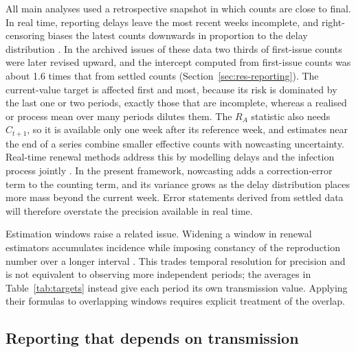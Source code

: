 All main analyses used a retrospective snapshot in which counts are close to final. In real time, reporting delays leave the most recent weeks incomplete, and right-censoring biases the latest counts downwards in proportion to the delay distribution \citep{hohle2014bayesian, mcgough2020nowcasting}. In the archived issues of these data two thirds of first-issue counts were later revised upward, and the intercept computed from first-issue counts was about 1.6 times that from settled counts (Section~\ref{sec:res-reporting}). The current-value target is affected first and most, because its risk is dominated by the last one or two periods, exactly those that are incomplete, whereas a realised or process mean over many periods dilutes them. The $R_A$ statistic also needs $C_{t+1}$, so it is available only one week after its reference week, and estimates near the end of a series combine smaller effective counts with nowcasting uncertainty. Real-time renewal methods address this by modelling delays and the infection process jointly \citep{abbott2020estimating, lison2024generative, gostic2020practical}. In the present framework, nowcasting adds a correction-error term to the counting term, and its variance grows as the delay distribution places more mass beyond the current week. Error statements derived from settled data will therefore overstate the precision available in real time.

Estimation windows raise a related issue. Widening a window in renewal estimators accumulates incidence while imposing constancy of the reproduction number over a longer interval \citep{cori2013new, gostic2020practical}. This trades temporal resolution for precision and is not equivalent to observing more independent periods; the averages in Table~\ref{tab:targets} instead give each period its own transmission value. Applying their formulas to overlapping windows requires explicit treatment of the overlap.

\subsection{Reporting that depends on transmission}
\label{sec:disc-reporting}

